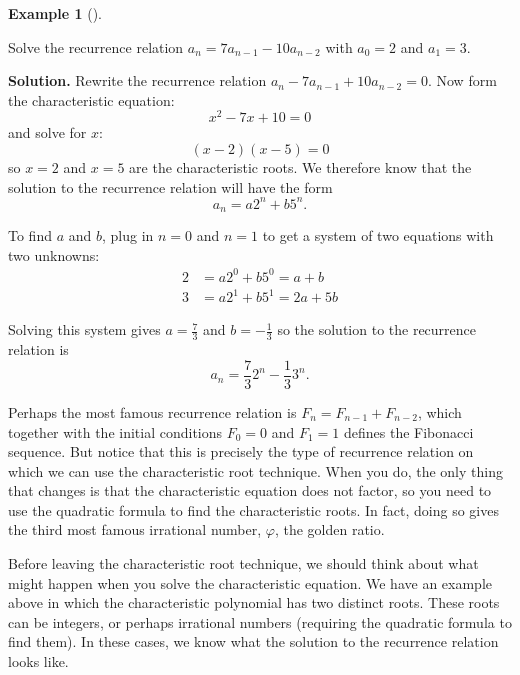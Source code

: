 \documentclass[10pt,]{book}
\theoremstyle{plain}
\theoremstyle{definition}
\newtheorem{example}[theorem]{Example}
\theoremstyle{definition}
\theoremstyle{definition}
\numberwithin{equation}{chapter}
\newcommand{\amp}{ & }
\begin{document}
\begin{example}[]\label{example-77}

Solve the recurrence relation \(a_n = 7a_{n-1} - 10 a_{n-2}\) with \(a_0 = 2\) and \(a_1 = 3\).
%
\par\medskip\noindent%
\textbf{Solution.}\quad
Rewrite the recurrence relation \(a_n - 7a_{n-1} + 10a_{n-2} = 0\). Now form the characteristic equation:
\begin{equation*}
  x^2 - 7x + 10 = 0
\end{equation*}
and solve for \(x\):
\begin{equation*}
  (x - 2) (x - 5) = 0
\end{equation*}
so \(x = 2\) and \(x = 5\) are the characteristic roots. We therefore know that the solution to the recurrence relation will have the form
\begin{equation*}
  a_n = a 2^n + b 5^n.
\end{equation*}
%
\par

To find \(a\) and \(b\), plug in \(n =0\) and \(n = 1\) to get a system of two equations with two unknowns:
\begin{align*}
  2 \amp  = a 2^0 + b 5^0 = a + b\\
  3 \amp  = a 2^1 + b 5^1 = 2a + 5b
\end{align*}
%
\par

Solving this system gives \(a = \frac{7}{3}\) and \(b = -\frac{1}{3}\) so the solution to the recurrence relation is
\begin{equation*}
  a_n = \frac{7}{3}2^n - \frac{1}{3} 3^n.
\end{equation*}
%
\end{example}
\par

Perhaps the most famous recurrence relation is \(F_n = F_{n-1} + F_{n-2}\), which together with the initial conditions \(F_0 = 0\) and \(F_1= 1\) defines the Fibonacci sequence.
But notice that this is precisely the type of recurrence relation on which we can use the characteristic root technique. When you do, the only thing that changes is that the characteristic equation does not factor, so you need to use the quadratic formula to find the characteristic roots. In fact, doing so gives the third most famous irrational number, \(\varphi\), the golden ratio.
%
\par

Before leaving the characteristic root technique, we should think about what might happen when you solve the characteristic equation. We have an example above in which the characteristic polynomial has two distinct roots. These roots can be integers, or perhaps irrational numbers (requiring the quadratic formula to find them). In these cases, we know what the solution to the recurrence relation looks like.
%
\par
\end{document}
